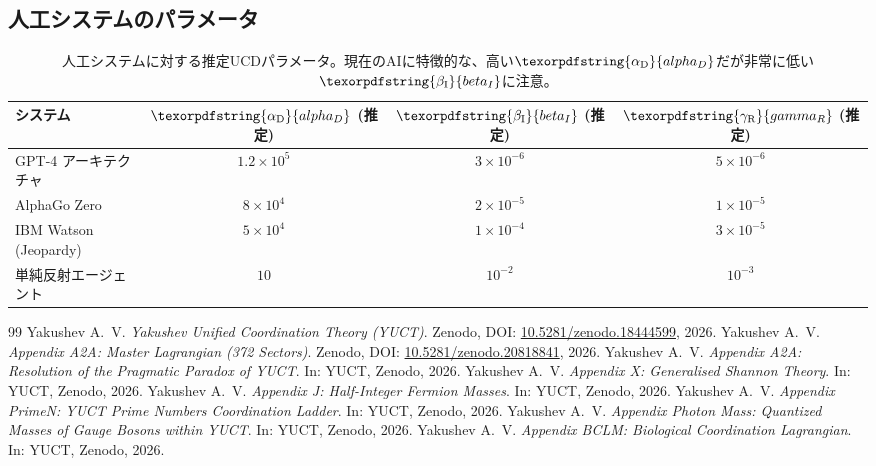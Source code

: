 \documentclass[11pt,a4paper]{article}
\DeclareRobustCommand{\alD}{\texorpdfstring{\ensuremath{\alpha_{\mathrm{D}}}}{alpha_D}}
\DeclareRobustCommand{\beI}{\texorpdfstring{\ensuremath{\beta_{\mathrm{I}}}}{beta_I}}
\DeclareRobustCommand{\gaR}{\texorpdfstring{\ensuremath{\gamma_{\mathrm{R}}}}{gamma_R}}
\begin{document}
	\subsection{人工システムのパラメータ}
	
	\begin{table}[ht]
		\centering
		\begin{tabular}{lccc}
			\toprule
			\textbf{システム} & \(\alD\) (推定) & \(\beI\) (推定) & \(\gaR\) (推定) \\
			\midrule
			GPT-4 アーキテクチャ & \(1.2 \times 10^5\) & \(3 \times 10^{-6}\) & \(5 \times 10^{-6}\) \\
			AlphaGo Zero & \(8 \times 10^4\) & \(2 \times 10^{-5}\) & \(1 \times 10^{-5}\) \\
			IBM Watson (Jeopardy) & \(5 \times 10^4\) & \(1 \times 10^{-4}\) & \(3 \times 10^{-5}\) \\
			単純反射エージェント & \(10\) & \(10^{-2}\) & \(10^{-3}\) \\
			\bottomrule
		\end{tabular}
		\caption{人工システムに対する推定UCDパラメータ。現在のAIに特徴的な、高い\(\alD\)だが非常に低い\(\beI\)に注意。}
		\label{tab:ai-measurements}
	\end{table}
	
	\begin{thebibliography}{99}
		Yakushev A.~V. \emph{Yakushev Unified Coordination Theory (YUCT)}. Zenodo, DOI: \href{https://doi.org/10.5281/zenodo.18444599}{10.5281/zenodo.18444599}, 2026.
		Yakushev A.~V. \emph{Appendix A2A: Master Lagrangian (372 Sectors)}. Zenodo, DOI: \href{https://doi.org/10.5281/zenodo.20818841}{10.5281/zenodo.20818841}, 2026.
		Yakushev A.~V. \emph{Appendix A2A: Resolution of the Pragmatic Paradox of YUCT}. In: YUCT, Zenodo, 2026.
		Yakushev A.~V. \emph{Appendix X: Generalised Shannon Theory}. In: YUCT, Zenodo, 2026.
		Yakushev A.~V. \emph{Appendix J: Half-Integer Fermion Masses}. In: YUCT, Zenodo, 2026.
		Yakushev A.~V. \emph{Appendix PrimeN: YUCT Prime Numbers Coordination Ladder}. In: YUCT, Zenodo, 2026.
		Yakushev A.~V. \emph{Appendix Photon Mass: Quantized Masses of Gauge Bosons within YUCT}. In: YUCT, Zenodo, 2026.
		Yakushev A.~V. \emph{Appendix BCLM: Biological Coordination Lagrangian}. In: YUCT, Zenodo, 2026.
	\end{thebibliography}
	
\end{document}
